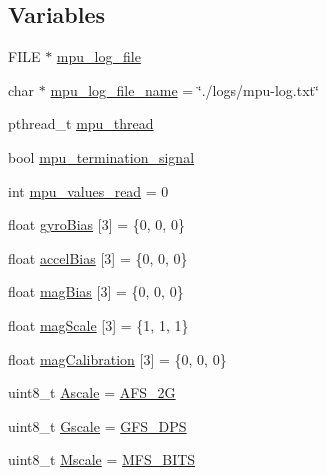 \subsection*{Variables}
\begin{DoxyCompactItemize}
\item 
F\+I\+LE $\ast$ \hyperlink{i2c-interface_8c_a39b3f1587df8e6477d59003340d72a07}{mpu\+\_\+log\+\_\+file}
\item 
char $\ast$ \hyperlink{i2c-interface_8c_ae8fcf6478128f7b8d13cbf4aa20b15b8}{mpu\+\_\+log\+\_\+file\+\_\+name} = \char`\"{}./logs/mpu-\/log.\+txt\char`\"{}
\item 
pthread\+\_\+t \hyperlink{i2c-interface_8c_aedec538763b6ceb42be09f1acc022481}{mpu\+\_\+thread}
\item 
bool \hyperlink{i2c-interface_8c_a57b41029138e4602ae95b39e0b0a1481}{mpu\+\_\+termination\+\_\+signal}
\item 
int \hyperlink{i2c-interface_8c_a905f548ca8723b609f1c2d1b7f8e4133}{mpu\+\_\+values\+\_\+read} = 0
\item 
float \hyperlink{i2c-interface_8c_aa64385fbcad462ca8d6e2f0c2a39f99b}{gyro\+Bias} \mbox{[}3\mbox{]} = \{0, 0, 0\}
\item 
float \hyperlink{i2c-interface_8c_ad9b8523cb349f7bbd3fa2ffa9c2c9d4b}{accel\+Bias} \mbox{[}3\mbox{]} = \{0, 0, 0\}
\item 
float \hyperlink{i2c-interface_8c_a1a620a5636dd84d145b489e421707aa4}{mag\+Bias} \mbox{[}3\mbox{]} = \{0, 0, 0\}
\item 
float \hyperlink{i2c-interface_8c_ac6c758c16370b67ea0d9f64e5f86d45f}{mag\+Scale} \mbox{[}3\mbox{]} = \{1, 1, 1\}
\item 
float \hyperlink{i2c-interface_8c_a4d41bf736f1c2b22106e031a60ab3380}{mag\+Calibration} \mbox{[}3\mbox{]} = \{0, 0, 0\}
\item 
uint8\+\_\+t \hyperlink{i2c-interface_8c_a1b3bba16cabe134bc640926508ec94d3}{Ascale} = \hyperlink{i2c-interface_8c_a809d38a83bb0293b913cb890cafd82a8a93154da7a495cfb3b9ab29d2d5d4891b}{A\+F\+S\+\_\+2G}
\item 
uint8\+\_\+t \hyperlink{i2c-interface_8c_a3842ef7e7823c37b07e3873e088f7df1}{Gscale} = \hyperlink{i2c-interface_8c_a56b5f26fc75e706b7513b8bac0006980a18297ef630f6920f812695549cc2262b}{G\+F\+S\+\_\+D\+PS}
\item 
uint8\+\_\+t \hyperlink{i2c-interface_8c_aa6ddcf863d1ec9145aaa8fd3b1fcb937}{Mscale} = \hyperlink{i2c-interface_8c_afaba316616b675d20293848d3f9a38d5ad9a80484caabaa2febccdcc7c524a41a}{M\+F\+S\+\_\+B\+I\+TS}

\end{DoxyCompactItemize}
